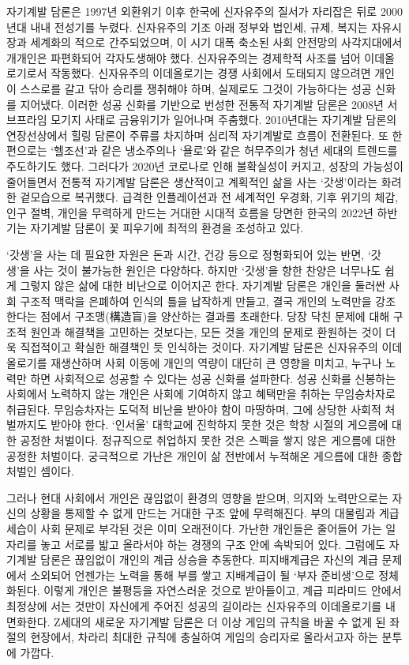 자기계발 담론은 1997년 외환위기 이후 한국에 신자유주의 질서가 자리잡은 뒤로 2000년대 내내 전성기를 누렸다. 신자유주의 기조 아래 정부와 법인세, 규제, 복지는 자유시장과 세계화의 적으로 간주되었으며, 이 시기 대폭 축소된 사회 안전망의 사각지대에서 개개인은 파편화되어 각자도생해야 했다. 신자유주의는 경제학적 사조를 넘어 이데올로기로서 작동했다. 신자유주의 이데올로기는 경쟁 사회에서 도태되지 않으려면 개인이 스스로를 갈고 닦아 승리를 쟁취해야 하며, 실제로도 그것이 가능하다는 성공 신화를 지어냈다. 이러한 성공 신화를 기반으로 번성한 전통적 자기계발 담론은 2008년 서브프라임 모기지 사태로 금융위기가 일어나며 주춤했다. 2010년대는 자기계발 담론의 연장선상에서 힐링 담론이 주류를 차지하며 심리적 자기계발로 흐름이 전환된다\cite{lws2018}. 또 한편으로는 `헬조선'과 같은 냉소주의나 `욜로'와 같은 허무주의가 청년 세대의 트렌드를 주도하기도 했다. 그러다가 2020년 코로나로 인해 불확실성이 커지고, 성장의 가능성이 줄어들면서 전통적 자기계발 담론은 생산적이고 계획적인 삶을 사는 `갓생'이라는 화려한 겉모습으로 복귀했다. 급격한 인플레이션과 전 세계적인 우경화, 기후 위기의 체감, 인구 절벽, 개인을 무력하게 만드는 거대한 시대적 흐름을 당면한 한국의 2022년 하반기는 자기계발 담론이 꽃 피우기에 최적의 환경을 조성하고 있다.

`갓생'을 사는 데 필요한 자원은 돈과 시간, 건강 등으로 정형화되어 있는 반면, `갓생'을 사는 것이 불가능한 원인은 다양하다. 하지만 `갓생'을 향한 찬양은 너무나도 쉽게 그렇지 않은 삶에 대한 비난으로 이어지곤 한다. 자기계발 담론은 개인을 둘러싼 사회 구조적 맥락을 은폐하여 인식의 틀을 납작하게 만들고, 결국 개인의 노력만을 강조한다는 점에서 구조맹(構造盲)을 양산하는 결과를 초래한다. 당장 닥친 문제에 대해 구조적 원인과 해결책을 고민하는 것보다는, 모든 것을 개인의 문제로 환원하는 것이 더욱 직접적이고 확실한 해결책인 듯 인식하는 것이다. 자기계발 담론은 신자유주의 이데올로기를 재생산하며 사회 이동에 개인의 역량이 대단히 큰 영향을 미치고, 누구나 노력만 하면 사회적으로 성공할 수 있다는 성공 신화를 설파한다. 성공 신화를 신봉하는 사회에서 노력하지 않는 개인은 사회에 기여하지 않고 혜택만을 취하는 무임승차자\cite{och2013}로 취급된다. 무임승차자는 도덕적 비난을 받아야 함이 마땅하며, 그에 상당한 사회적 처벌까지도 받아야 한다. `인서울' 대학교에 진학하지 못한 것은 학창 시절의 게으름에 대한 공정한 처벌이다. 정규직으로 취업하지 못한 것은 스펙을 쌓지 않은 게으름에 대한 공정한 처벌이다. 궁극적으로 가난은 개인이 삶 전반에서 누적해온 게으름에 대한 종합 처벌인 셈이다.

그러나 현대 사회에서 개인은 끊임없이 환경의 영향을 받으며, 의지와 노력만으로는 자신의 상황을 통제할 수 없게 만드는 거대한 구조 앞에 무력해진다. 부의 대물림과 계급 세습이 사회 문제로 부각된 것은 이미 오래전이다. 가난한 개인들은 줄어들어 가는 일자리를 놓고 서로를 밟고 올라서야 하는 경쟁의 구조 안에 속박되어 있다. 그럼에도 자기계발 담론은 끊임없이 개인의 계급 상승을 추동한다. 피지배계급은 자신의 계급 문제에서 소외되어 언젠가는 노력을 통해 부를 쌓고 지배계급이 될 `부자 준비생'으로 정체화된다. 이렇게 개인은 불평등을 자연스러운 것으로 받아들이고, 계급 피라미드 안에서 최정상에 서는 것만이 자신에게 주어진 성공의 길이라는 신자유주의 이데올로기를 내면화한다. Z세대의 새로운 자기계발 담론은 더 이상 게임의 규칙을 바꿀 수 없게 된 좌절의 현장에서, 차라리 최대한 규칙에 충실하여 게임의 승리자로 올라서고자 하는 분투에 가깝다.

